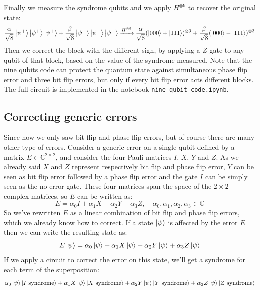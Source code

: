 \documentclass{article}
\begin{document}
	Finally we  measure the syndrome qubits and we apply $H^{\otimes 9}$ to recover the original state:
	\[ \frac{\alpha}{\sqrt{8}}\ket{\psi^+}\ket{\psi^+}\ket{\psi^+} + \frac{\beta}{\sqrt{8}}\ket{\psi^-}\ket{\psi^-}\ket{\psi^-} \xrightarrow{H^{\otimes 9}} \frac{\alpha}{\sqrt{8}}(\ket{000} + \ket{111})^{\otimes 3} + \frac{\beta}{\sqrt{8}}(\ket{000} - \ket{111})^{\otimes 3} \]
	Then we correct the block with the different sign, by applying a $Z$ gate to any qubit of that block, based on the value of the syndrome measured. Note that the nine qubits code can protect the quantum state against simultaneous phase flip error and three bit flip errors, but only if every bit flip error acts different blocks.\\ The full circuit is implemented in the notebook \verb|nine_qubit_code.ipynb|.
	
	\subsection{Correcting generic errors}
	Since now we only saw bit flip and phase flip errors, but of course there are many other type of errors. Consider a generic error on a single qubit defined by a matrix $E \in \mathbb{C}^{2 \times 2}$, and consider the four Pauli matrices $I$, $X$, $Y$ and $Z$. As we already said $X$ and $Z$ represent respectively bit flip and phase flip error, $Y$ can be seen as bit flip error followed by a phase flip error and the gate $I$ can be simply seen as the no-error gate. These four matrices span the space of the $2 \times 2$ complex matrices, so $E$ can be written as:
	\[ E = \alpha_0I + \alpha_1X + \alpha_2Y + \alpha_3Z, \quad \alpha_0, \alpha_1, \alpha_2, \alpha_3 \in \mathbb{C}\]
	So we've rewritten $E$ as a linear combination of bit flip and phase flip errors, which we already know how to correct. If a state $\ket{\psi}$ is affected by the error $E$ then we can write the resulting state as: 
	\[ E\ket{\psi} = \alpha_0\ket{\psi} + \alpha_1X\ket{\psi} + \alpha_2Y\ket{\psi} + \alpha_3Z\ket{\psi} \]
	If we apply a circuit to correct the error on this state, we'll get a syndrome for each term of the superposition:
	\[ \alpha_0\ket{\psi}\ket{I \text{ syndrome}} + \alpha_1X\ket{\psi}\ket{X \text{ syndrome}} + \alpha_2Y\ket{\psi}\ket{Y \text{ syndrome}} + \alpha_3Z\ket{\psi}\ket{Z \text{ syndrome}} \]
	
\end{document}
